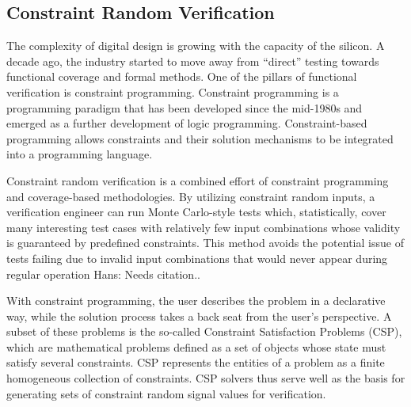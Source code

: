 \documentclass[runningheads]{llncs}
\newcommand{\hjd}[1]{{\color{pink} Hans: #1}}
\begin{document}
\subsection{Constraint Random Verification}
The complexity of digital design is growing with the capacity of the silicon. A decade ago, the industry started to move away from ``direct'' testing towards functional coverage and formal methods. One of the pillars of functional verification is constraint programming. Constraint programming is a programming paradigm that has been developed since the mid-1980s and emerged as a further development of logic programming. Constraint-based programming allows constraints and their solution mechanisms to be integrated into a programming language.

Constraint random verification is a combined effort of constraint programming and coverage-based methodologies. By utilizing constraint random inputs, a verification engineer can run Monte Carlo-style tests which, statistically, cover many interesting test cases with relatively few input combinations whose validity is guaranteed by predefined constraints. This method avoids the potential issue of tests failing due to invalid input combinations that would never appear during regular operation \hjd{Needs citation.}.

With constraint programming, the user describes the problem in a declarative way, while the solution process takes a back seat from the user's perspective. A subset of these problems is the so-called Constraint Satisfaction Problems (CSP), which are mathematical problems defined as a set of objects whose state must satisfy several constraints. CSP represents the entities of a problem as a finite homogeneous collection of constraints. CSP solvers thus serve well as the basis for generating sets of constraint random signal values for verification.

%
\end{document}

